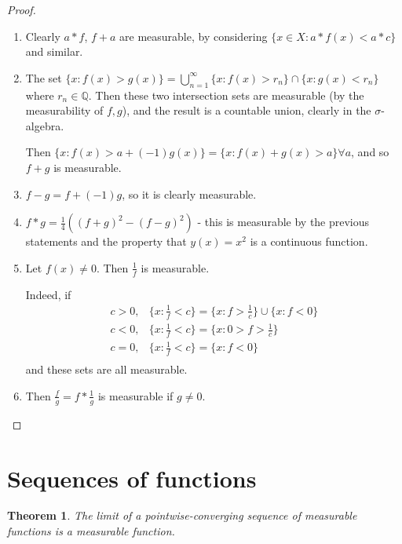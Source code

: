 \documentclass[11pt,a4paper]{report}
\theoremstyle{plain}
\newtheorem{thm}{Theorem}[section]
\theoremstyle{definition}
\theoremstyle{remark}
\newcommand{\union}{\cup}
\newcommand{\intersection}{\cap}
\newcommand{\Union}{\bigcup}
\newcommand{\Q}{\mathbb{Q}}
\begin{document}
\begin{proof}
  \begin{enumerate}
    \item Clearly $a*f$, $f + a$ are measurable, by considering $\{ x \in X : a*f(x) < a*c \}$ and similar.
    \item The set $\{ x : f(x) > g(x) \} = \Union_{n=1}^\infty \{x : f(x) > r_n \} \intersection \{ x : g(x) < r_n \}$ where $r_n \in \Q$. Then these two intersection sets are measurable (by the measurability of $f, g$), and the result is a countable union, clearly in the $\sigma$-algebra.

      Then $\{ x : f(x) > a + (-1)g(x) \} = \{ x : f(x) + g(x) > a \} \forall a $, and so $f + g$ is measurable.
    \item $f - g = f + (-1)g$, so it is clearly measurable.
    \item $f * g = \frac{1}{4} ((f + g)^2 - (f - g)^2)$ - this is measurable by the previous statements and the property that $y(x) = x^2$ is a continuous function.
    \item Let $f(x) \ne 0$. Then $\frac{1}{f}$ is measurable.

        Indeed, if
        \begin{align*}
            c > 0,& \{x : \frac{1}{f} < c \} = \{x : f > \frac{1}{c} \} \union \{ x : f < 0 \} \\
            c < 0,& \{x : \frac{1}{f} < c \} = \{x : 0 > f > \frac{1}{c} \} \\
            c = 0,& \{x : \frac{1}{f} < c \} = \{x : f < 0\} \\
        \end{align*}
        and these sets are all measurable.
    \item Then $\frac{f}{g} = f * \frac{1}{g}$ is measurable if $g \neq 0$.
  \end{enumerate}
\end{proof}

\section{Sequences of functions}

\begin{thm}
  \label{limit_of_seq_of_measurable_functions_is_measurable}
  The limit of a pointwise-converging sequence of measurable functions is a measurable function.
\end{thm}
\end{document}
